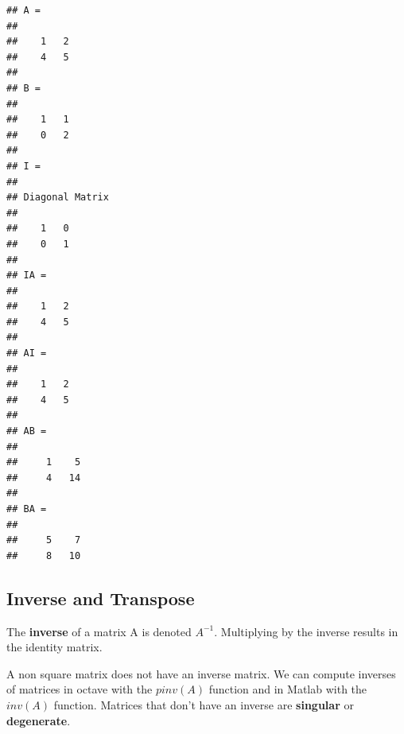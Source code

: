 \documentclass[
]{article}
\newenvironment{Shaded}{\begin{snugshade}}{\end{snugshade}}
\newcommand{\BuiltInTok}[1]{#1}
\newcommand{\CommentTok}[1]{\textcolor[rgb]{0.56,0.35,0.01}{\textit{#1}}}
\newcommand{\FloatTok}[1]{\textcolor[rgb]{0.00,0.00,0.81}{#1}}
\newcommand{\FunctionTok}[1]{\textcolor[rgb]{0.00,0.00,0.00}{#1}}
\newcommand{\NormalTok}[1]{#1}
\newcommand{\OperatorTok}[1]{\textcolor[rgb]{0.81,0.36,0.00}{\textbf{#1}}}
\begin{document}
\begin{Shaded}
\end{Shaded}

\begin{verbatim}
## A =
## 
##    1   2
##    4   5
## 
## B =
## 
##    1   1
##    0   2
## 
## I =
## 
## Diagonal Matrix
## 
##    1   0
##    0   1
## 
## IA =
## 
##    1   2
##    4   5
## 
## AI =
## 
##    1   2
##    4   5
## 
## AB =
## 
##     1    5
##     4   14
## 
## BA =
## 
##     5    7
##     8   10
\end{verbatim}

\hypertarget{inverse-and-transpose}{%
\subsection{Inverse and Transpose}\label{inverse-and-transpose}}

The \textbf{inverse} of a matrix A is denoted \(A^{-1}\). Multiplying by
the inverse results in the identity matrix.

A non square matrix does not have an inverse matrix. We can compute
inverses of matrices in octave with the \(pinv(A)\) function and in
Matlab with the \(inv(A)\) function. Matrices that don't have an inverse
are \textbf{singular} or \textbf{degenerate}.
\end{document}

